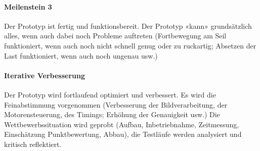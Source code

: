 \documentclass[a4paper,11pt]{scrartcl}
\begin{document}
\paragraph{Meilenstein 3} Der Prototyp ist fertig und funktionsbereit. Der Prototyp «kann» grundsätzlich alles, wenn auch dabei noch Probleme auftreten (Fortbewegung am Seil funktioniert, wenn auch noch nicht schnell genug oder zu ruckartig; Absetzen der Last funktioniert, wenn auch noch ungenau usw.)

\paragraph{Iterative Verbesserung} Der Prototyp wird fortlaufend optimiert und verbessert. Es wird die Feinabstimmung vorgenommen (Verbesserung der Bildverarbeitung, der Motorensteuerung, des Timings; Erhöhung der Genauigkeit usw.) Die Wettbewerbssituation wird geprobt (Aufbau, Inbetriebnahme, Zeitmessung, Einschätzung Punktbewertung, Abbau), die Testläufe werden analysiert und kritisch reflektiert.
\end{document}

